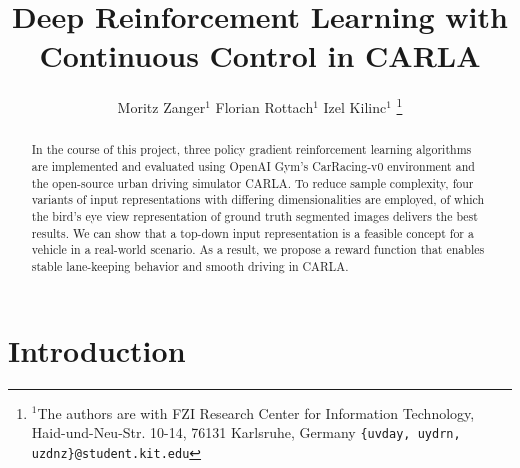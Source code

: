 \documentclass[letterpaper, 10 pt, conference]{ieeeconf}  %
\title{\LARGE \bf
Deep Reinforcement Learning with Continuous Control in CARLA
}
\author{Moritz Zanger$^{1}$ Florian Rottach$^{1}$ Izel Kilinc$^{1}$ %
\thanks{$^{1}$The authors are with FZI Research Center for Information Technology, Haid-und-Neu-Str. 10-14, 76131 Karlsruhe, Germany
        {\tt\small \{uvday, uydrn, uzdnz\}@student.kit.edu}}%
}
\begin{document}
\maketitle
\thispagestyle{empty}
\pagestyle{empty}


\begin{abstract}


In the course of this project, three policy gradient reinforcement learning algorithms 
are implemented and evaluated using OpenAI Gym's CarRacing-v0 environment and the open-source 
urban driving simulator CARLA. To reduce sample complexity, four variants of input representations with 
differing dimensionalities are employed, of which the bird's eye view representation of ground truth 
segmented images delivers the best results. We can show that a top-down input representation is a feasible concept 
for a vehicle in a real-world scenario. As a result, we propose a reward function that enables stable 
lane-keeping behavior and smooth driving in CARLA.
\end{abstract}


\section{Introduction}

\end{document}
